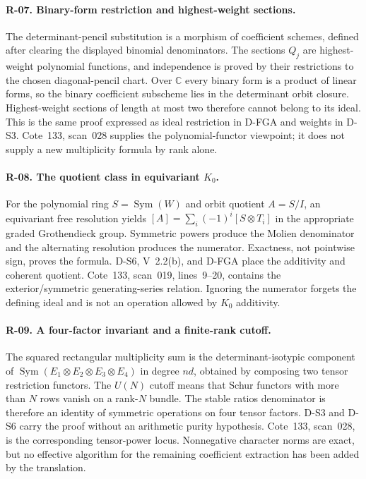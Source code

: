 \paragraph{R-07. Binary-form restriction and highest-weight sections.}
The determinant-pencil substitution is a morphism of coefficient schemes, defined after clearing the displayed binomial denominators. The sections $Q_j$ are highest-weight polynomial functions, and independence is proved by their restrictions to the chosen diagonal-pencil chart. Over $\mathbb C$ every binary form is a product of linear forms, so the binary coefficient subscheme lies in the determinant orbit closure. Highest-weight sections of length at most two therefore cannot belong to its ideal. This is the same proof expressed as ideal restriction in D-FGA and weights in D-S3. Cote~133, scan~028 supplies the polynomial-functor viewpoint; it does not supply a new multiplicity formula by rank alone.

\paragraph{R-08. The quotient class in equivariant $K_0$.}
For the polynomial ring $S=\operatorname{Sym}(W)$ and orbit quotient $A=S/I$, an equivariant free resolution yields $[A]=\sum_i(-1)^i[S\otimes T_i]$ in the appropriate graded Grothendieck group. Symmetric powers produce the Molien denominator and the alternating resolution produces the numerator. Exactness, not pointwise sign, proves the formula. D-S6, V~2.2(b), and D-FGA place the additivity and coherent quotient. Cote~133, scan~019, lines~9--20, contains the exterior/symmetric generating-series relation. Ignoring the numerator forgets the defining ideal and is not an operation allowed by $K_0$ additivity.

\paragraph{R-09. A four-factor invariant and a finite-rank cutoff.}
The squared rectangular multiplicity sum is the determinant-isotypic component of $\operatorname{Sym}(E_1\otimes E_2\otimes E_3\otimes E_4)$ in degree $nd$, obtained by composing two tensor restriction functors. The $U(N)$ cutoff means that Schur functors with more than $N$ rows vanish on a rank-$N$ bundle. The stable ratios denominator is therefore an identity of symmetric operations on four tensor factors. D-S3 and D-S6 carry the proof without an arithmetic purity hypothesis. Cote~133, scan~028, is the corresponding tensor-power locus. Nonnegative character norms are exact, but no effective algorithm for the remaining coefficient extraction has been added by the translation.

